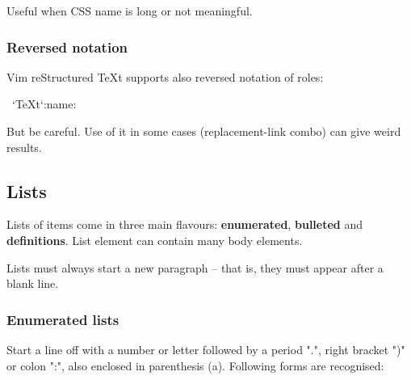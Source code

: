 \documentclass[12pt]{article}
\begin{document}
Useful when CSS name is long or not meaningful.

\hypertarget{lreversed-notation}{}
\subsubsection{Reversed notation}

Vim reStructured \TeX{}t supports also reversed notation of roles:

\begin{ttfamily}\begin{flushleft}
\mbox{~`\TeX{}t`:name:}\\
\end{flushleft}\end{ttfamily}

But be careful. Use of it in some cases (replacement-link combo) can give
weird results.

\hypertarget{llists}{}
\subsection{Lists}

Lists of items come in three main flavours: \textbf{enumerated}, \textbf{bulleted} and
\textbf{definitions}. List element can contain many body elements.

Lists must always start a new paragraph -- that is, they must appear
after a blank line.

\hypertarget{lenumerated-lists}{}
\subsubsection{Enumerated lists}

Start a line off with a number or letter followed by a period ".",
right bracket ")" or colon ":", also enclosed in parenthesis (a). Following
forms are recognised:
\end{document}
